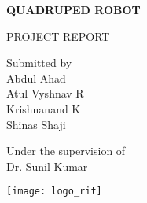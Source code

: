 \begin{center}
\vspace{4cm}

{\Huge\textbf{QUADRUPED ROBOT}}\\
\vspace{2cm}

\Large PROJECT REPORT\\
\vspace{1.75cm}

Submitted by\\
\vspace{0.5cm}
\large Abdul Ahad\\
\large Atul Vyshnav R\\
\large Krishnanand K\\ 
\large Shinas Shaji\\
\vspace{1.5cm}

Under the supervision of\\
\large Dr. Sunil Kumar\\
\vspace{1cm}

\texttt{[image: logo\_rit]}

\vspace*{\fill}
\end{center}

\begin{center}
    
\end{center}